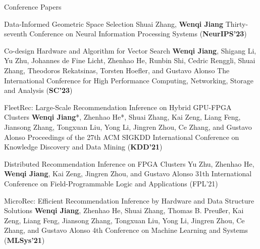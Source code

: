 \begin{rSection}{Conference Papers}
\begin{enumerate}[label={[\arabic*]}]

\item 
\begin{Pub}{Data-Informed Geometric Space Selection}
{Shuai Zhang, \textbf{Wenqi Jiang}}
{Thirty-seventh Conference on Neural Information Processing Systems (\textbf{NeurIPS'23})}
\end{Pub}

\item 
\begin{Pub}{Co-design Hardware and Algorithm for Vector Search}
{\textbf{Wenqi Jiang}, Shigang Li, Yu Zhu, Johannes de Fine Licht, Zhenhao He, Runbin Shi, Cedric Renggli, Shuai Zhang, Theodoros Rekatsinas, Torsten Hoefler, and Gustavo Alonso}
{The International Conference for High Performance Computing, Networking, Storage and Analysis (\textbf{SC'23})}
\end{Pub}

\item 
\begin{Pub}{FleetRec: Large-Scale Recommendation Inference on Hybrid GPU-FPGA Clusters}
{\textbf{Wenqi Jiang}*, Zhenhao He*, Shuai Zhang, Kai Zeng, Liang Feng, Jiansong Zhang, Tongxuan Liu, Yong Li, Jingren Zhou, Ce Zhang, and Gustavo Alonso}
{Proceedings of the 27th ACM SIGKDD International Conference on Knowledge Discovery and Data Mining (\textbf{KDD'21})}
\end{Pub}

\item 
\begin{Pub}{Distributed Recommendation Inference on FPGA Clusters}
{Yu Zhu, Zhenhao He, \textbf{Wenqi Jiang}, Kai Zeng, Jingren Zhou, and Gustavo Alonso}
{31th International Conference on Field-Programmable Logic and Applications (FPL'21)}
\end{Pub}

\item 
\begin{Pub}{MicroRec: Efficient Recommendation Inference by Hardware and Data Structure Solutions}
{\textbf{Wenqi Jiang}, Zhenhao He, Shuai Zhang, Thomas B. Preußer, Kai Zeng, Liang Feng, Jiansong Zhang, Tongxuan Liu, Yong Li, Jingren Zhou, Ce Zhang, and Gustavo Alonso}
{4th Conference on Machine Learning and Systems (\textbf{MLSys'21})}
\end{Pub}\end{enumerate}
\end{rSection}



